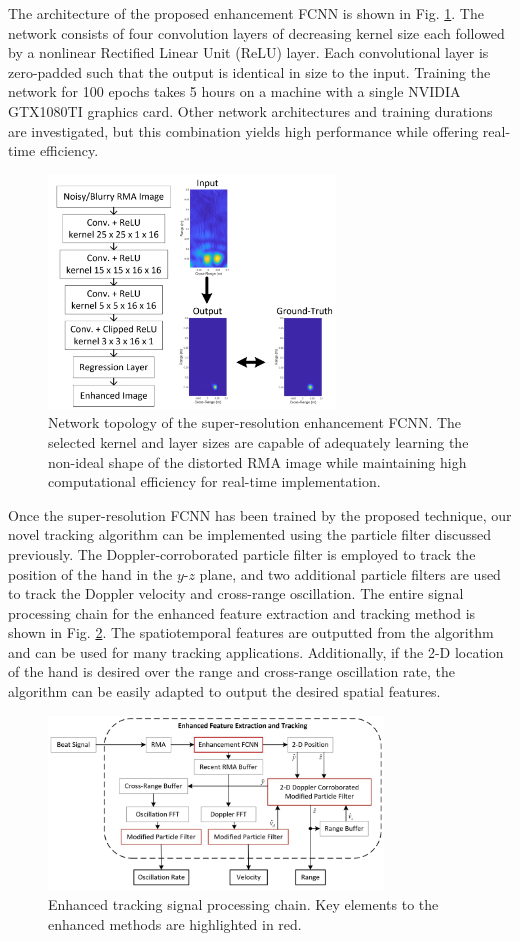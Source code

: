 \documentclass[10pt,journal,final]{IEEEtran}
\begin{document}
The architecture of the proposed enhancement FCNN is shown in Fig. \ref{fig:fcnn_architecture}.
The network consists of four convolution layers of decreasing kernel size each followed by a nonlinear Rectified Linear Unit (ReLU) layer. Each convolutional layer is zero-padded such that the output is identical in size to the input. 
Training the network for 100 epochs takes 5 hours on a machine with a single NVIDIA GTX1080TI graphics card. 
Other network architectures and training durations are investigated, but this combination yields high performance while offering real-time efficiency.
\begin{figure}[h]
	\centering
	\includegraphics[width=3in]{smith6.jpg}
	\caption{Network topology of the super-resolution enhancement FCNN. The selected kernel and layer sizes are capable of adequately learning the non-ideal shape of the distorted RMA image while maintaining high computational efficiency for real-time implementation.}
	\label{fig:fcnn_architecture}
\end{figure}

Once the super-resolution FCNN has been trained by the proposed technique, our novel tracking algorithm can be implemented using the particle filter discussed previously.
The Doppler-corroborated particle filter is employed to track the position of the hand in the $y$-$z$ plane, and two additional particle filters are used to track the Doppler velocity and cross-range oscillation.
The entire signal processing chain for the enhanced feature extraction and tracking method is shown in Fig. \ref{fig:enhanced_signal_chain}.
The spatiotemporal features are outputted from the algorithm and can be used for many tracking applications.
Additionally, if the 2-D location of the hand is desired over the range and cross-range oscillation rate, the algorithm can be easily adapted to output the desired spatial features.

\begin{figure}[h]
	\centering
	\includegraphics[width=3.5in]{smith7.jpg}
	\caption{Enhanced tracking signal processing chain. Key elements to the enhanced methods are highlighted in red.}
	\label{fig:enhanced_signal_chain}
\end{figure}
\end{document}
